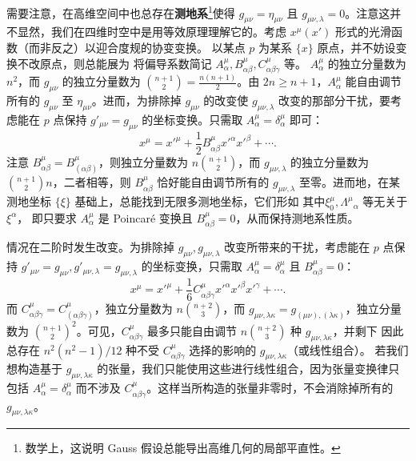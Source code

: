 需要注意，在高维空间中也总存在\textbf{测地系}\footnote{数学上，这说明 Gauss 假设总能导出高维几何的局部平直性。}使得 $g_{\mu\nu}=\eta_{\mu\nu}$ 且 $g_{\mu\nu,\lambda}=0$。注意这并不显然，我们在四维时空中是用等效原理理解它的。考虑 $x^\mu(x')$ 形式的光滑函数（而非反之）以迎合度规的协变变换。
以某点 $p$ 为某系 $\{x\}$ 原点，并不妨设变换不改原点，则总能展为
将偏导系数简记 $A^\mu_\alpha,B^\mu_{\alpha\beta},C^\mu_{\alpha\beta\gamma}$ 等。
$A^\mu_\alpha$ 的独立分量数为 $n^2$，而 $g_{\mu\nu}$ 的独立分量数为 $\binom {n+1}{2}=\frac{n(n+1)}{2}$。由 $2n\geqslant n+1$，$A^\mu_\alpha$ 能自由调节所有的 $g_{\mu\nu}$ 至 $\eta_{\mu\nu}$。进而，为排除掉 $g_{\mu\nu}$ 的改变使 $g_{\mu\nu,\lambda}$ 改变的那部分干扰，要考虑能在 $p$ 点保持 $g'_{\mu\nu}= g_{\mu\nu}$ 的坐标变换。只需取 $A^\mu_\alpha=\delta^\mu_\alpha$ 即可：
\[x^\mu=x'^\mu+\frac 12 B^\mu_{\alpha\beta} x'^\alpha x'^\beta +\cdots.\]
注意 $B^\mu_{\alpha\beta}=B^\mu_{(\alpha\beta)}$，则独立分量数为 $n\binom {n+1}{2}$，而 $g_{\mu\nu,\lambda}$ 的独立分量数为 $\binom {n+1}{2}n$，二者相等，则 $B^\mu_{\alpha\beta}$ 恰好能自由调节所有的 $g_{\mu\nu,\lambda}$ 至零。进而地，在某测地坐标 $\{\xi\}$ 基础上，总能找到无限多测地坐标，它们形如
其中$\xi^\mu_0,\Lambda^\mu{}_\alpha$ 等无关于 $\xi^\alpha$，
即只要求 $A^\mu_\alpha$ 是 Poincaré 变换且 $B^\mu_{\alpha\beta}=0$，从而保持测地系性质。

情况在二阶时发生改变。为排除掉 $g_{\mu\nu},g_{\mu\nu,\lambda}$ 改变所带来的干扰，考虑能在 $p$ 点保持 $g'_{\mu\nu}= g_{\mu\nu}, g'_{\mu\nu,\lambda}=g_{\mu\nu,\lambda}$ 的坐标变换，只需取 $A^\mu_\alpha=\delta^\mu_\alpha$ 且 $B^\mu_{\alpha\beta}=0$：
\[x^\mu=x'^\mu + \frac 16 C^\mu_{\alpha\beta\gamma} x'^\alpha x'^\beta x'^\gamma+\cdots.\]
而 $C^\mu_{\alpha\beta\gamma}=C^\mu_{(\alpha\beta\gamma)}$，独立分量数为 $n\binom {n+2}{3}$，而 $g_{\mu\nu,\lambda\kappa}=g_{(\mu\nu),(\lambda\kappa)}$，独立分量数为 ${\binom {n+1}{2}}^2$。可见，$C^\mu_{\alpha\beta\gamma}$ 最多只能自由调节 $n\binom {n+2}{3}$ 种 $g_{\mu\nu,\lambda\kappa}$，并剩下
因此总存在 ${n^2(n^2-1)}/{12}$ 种不受 $C^\mu_{\alpha\beta\gamma}$ 选择的影响的 $g_{\mu\nu,\lambda\kappa}$（或线性组合）。
若我们想构造基于 $g_{\mu\nu,\lambda\kappa}$ 的张量，我们只能使用这些进行线性组合，因为张量变换律只包括 $A^\mu_\alpha=\delta^\mu_\alpha$ 而不涉及 $C^\mu_{\alpha\beta\gamma}$。这样当所构造的张量非零时，不会消除掉所有的 $g_{\mu\nu,\lambda\kappa}$。


